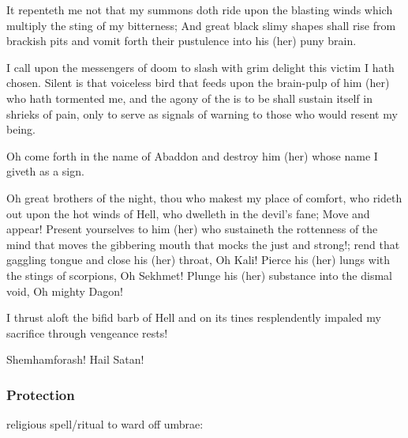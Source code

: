 {  It repenteth me not that my summons doth ride upon the blasting winds which multiply   the sting of my bitterness; And great black slimy shapes shall rise from brackish pits 
  and vomit forth their pustulence into his (her) puny brain. 
  
  I call upon the messengers of doom to slash with grim delight this victim I hath chosen. Silent is that voiceless bird that feeds upon the brain-pulp of him (her) who hath tormented me, and the agony of the is to be shall sustain itself in shrieks of pain, only to serve as signals of warning to those who would resent my being. 
  
  Oh come forth in the name of Abaddon and destroy him (her) whose name I giveth as a sign. 
  
  Oh great brothers of the night, thou who makest my place of comfort, who rideth out upon the hot winds of Hell, who dwelleth in the devil's fane; Move and appear! Present yourselves to him (her) who sustaineth the rottenness of the mind that moves the gibbering mouth that mocks the just and strong!; rend that gaggling tongue and close his (her) throat, Oh Kali! Pierce his (her) lungs with the stings of scorpions, Oh Sekhmet! Plunge his (her) substance into the dismal void, Oh mighty Dagon! 
  
  I thrust aloft the bifid barb of Hell and on its tines resplendently impaled my sacrifice through vengeance rests! 
  
  Shemhamforash! Hail Satan!
}





\subsubsection{Protection}
\Merkyran religious spell/ritual to ward off umbrae:

